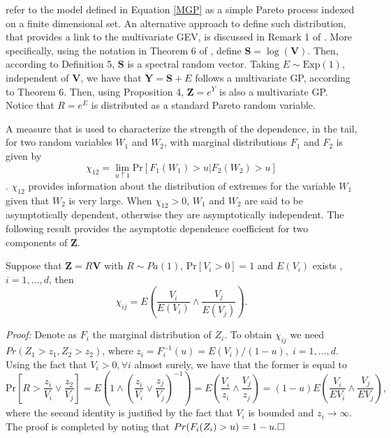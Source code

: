 \cite{ferreira2014} refer to the model defined in Equation \eqref{MGP} as a simple 
Pareto process indexed on a finite dimensional set. An alternative approach to 
define such distribution, that provides a link to the multivariate GEV, is discussed 
in Remark 1 of \cite{RoSeWa2018a}. More specifically, 
using the notation in Theorem 6 of \cite{RoSeWa2018a}, define $\bm{S} = \log(\bm{V})$. 
Then, according to Definition 5, $\bm{S}$ is a spectral random vector. Taking 
$E \sim \text{Exp}(1)$, independent of $\bm{V}$, we have that $\bm{Y} = \bm{S} + E$ 
follows a multivariate GP, according to Theorem 6.  Then, using Proposition 4, 
$\bm{Z} = e^{Y}$ is also a multivariate GP. Notice that $R = e^E$ is distributed as 
a standard Pareto random variable.

A measure that is used to characterize the strength of the dependence,
in the tail, for two random variables $W_1$ and $W_2$, with marginal
distributions $F_1$ and $F_2$ is given by
\[	\chi_{12} = \lim_{u\uparrow 1} \text{Pr}[ F_1(W_1)>u|F_2(W_2)>u]  \]
\citep{coles2001}.
$\chi_{12}$ provides information about the distribution of extremes for the variable $W_1$
given that $W_2$ is very large.  When $\chi_{12}>0$, $W_1$ and $W_2$ 
are said to
be asymptotically dependent, otherwise they are asymptotically
independent. The following result provides the asymptotic dependence coefficient for two components of $\bm{Z}$. 
\begin{prop} \label{ppchi}
Suppose that $\bm{Z} = R\bm{V}$ with $R\sim Pa(1)$,
$\text{Pr}[V_i>0] = 1$ and $E(V_i)$ exists ,
$i=1, \ldots ,d$, then
\begin{equation}
	\chi_{ij} = E\left(\frac{V_i}{E(V_i)} \wedge 
\frac{V_j}{E(V_j)}\right).
\end{equation}
\end{prop}
{\em Proof:}
Denote as $F_i$ the marginal distribution of $Z_i$. To obtain $\chi_{ij}$ we need $Pr(Z_1>z_1,Z_2>z_2)$, where $z_i =
F_i^{-1}(u) = E(V_i)/(1 - u), \;i=1,\dots, d$.
Using the fact that
$V_i>0, \forall i$ almost surely, we have that the former is equal to
\[	\text{Pr}\left[R>\frac{z_i}{V_i}\vee\frac{z_2}{V_j}\right] =
E\left(1\wedge\left(\frac{z_i}{V_i}\vee\frac{z_j}{V_j}\right)
^{-1} \right)
= E\left( \frac{V_i}{z_i}\wedge\frac{V_j}{z_j}
\right) = (1 - u)E\left(
\frac{V_i}{EV_i}\wedge\frac{V_j}{EV_j}
\right) ,
\]
where the second identity is justified by the fact that $V_i$ is
bounded and $z_i\rightarrow\infty$. The proof is completed by noting
that $Pr(F_i(Z_i)>u ) = 1 - u.\hfill\Box$

